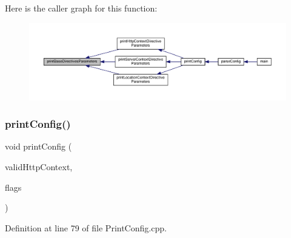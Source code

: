 Here is the caller graph for this function\+:
\nopagebreak
\begin{figure}[H]
\begin{center}
\leavevmode
\includegraphics[width=350pt]{classft_1_1_print_config_ad71821d54e46c04a81d26dbabd3c4b20_icgraph}
\end{center}
\end{figure}
\mbox{\label{classft_1_1_print_config_a09fbf488251ed5f5079e798b1ce04caf}} 
\subsubsection{\texorpdfstring{print\+Config()}{printConfig()}}
{\footnotesize\ttfamily void print\+Config (\begin{DoxyParamCaption}\item[{std\+::pair$<$ bool, \hyperlink{classft_1_1_http_block}{Http\+Block} $>$ \&}]{valid\+Http\+Context,  }\item[{int}]{flags }\end{DoxyParamCaption})\hspace{0.3cm}{\ttfamily [static]}}



Definition at line 79 of file Print\+Config.\+cpp.


